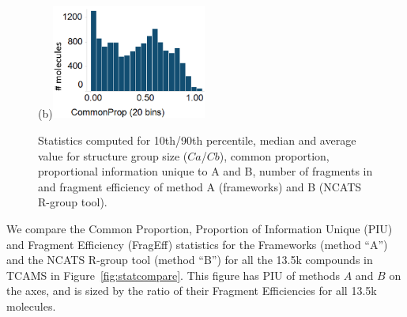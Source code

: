 \documentclass[journal=jacsat,manuscript=article]{achemso}
\newcommand*\fref[1]{Figure~\ref{fig:#1}}
\begin{document}
\begin{figure}
  \begin{minipage}[c]{\linewidth}
\vspace{0pt}
\centering
{}
(b)\includegraphics[width=2in]{fig/CP_TCAMS_GSKFW_RGT.png}
  \end{minipage}
  \caption{Statistics computed for 10th/90th percentile, median and average value for structure group size ($Ca$/$Cb$), common proportion, proportional information unique to A and B, number of fragments in and fragment efficiency of method A (frameworks) and B (NCATS R-group tool).}
\label{fig:statcomparetable}
\end{figure}


We compare the Common Proportion, Proportion of Information Unique (PIU) and Fragment Efficiency (FragEff) statistics for the Frameworks (method ``A'') and the NCATS R-group tool (method ``B'') for all the 13.5k compounds in TCAMS in \fref{statcompare}.  This figure has PIU of methods $A$ and $B$ on the axes, and is sized by the ratio of their Fragment Efficiencies for all 13.5k molecules.   
\end{document}
